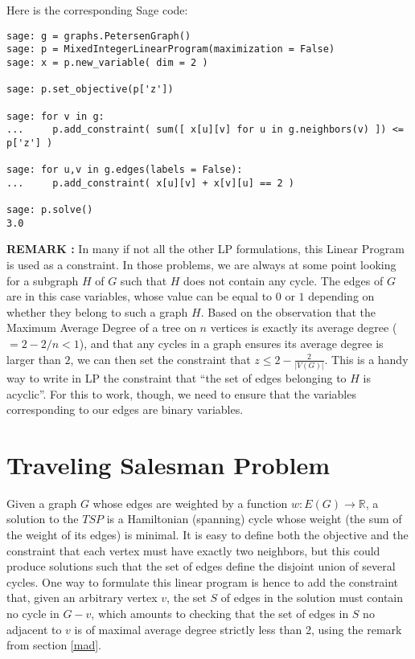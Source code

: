 Here is the corresponding Sage code:

\begin{lstlisting}
sage: g = graphs.PetersenGraph()
sage: p = MixedIntegerLinearProgram(maximization = False)
sage: x = p.new_variable( dim = 2 )

sage: p.set_objective(p['z'])

sage: for v in g:
...     p.add_constraint( sum([ x[u][v] for u in g.neighbors(v) ]) <= p['z'] )

sage: for u,v in g.edges(labels = False):
...     p.add_constraint( x[u][v] + x[v][u] == 2 )

sage: p.solve()
3.0
\end{lstlisting}

{\bf REMARK : } In many if not all the other LP formulations, this Linear Program is used as a constraint. In those problems, we are always at some point looking for a subgraph $H$ of $G$ such that $H$ does not contain any cycle. The edges of $G$ are in this case variables, whose value can be equal to $0$ or $1$ depending on whether they belong to such a graph $H$. Based on the observation that the Maximum Average Degree of a tree on $n$ vertices is exactly its average degree ($=2-2/n<1$), and that any cycles in a graph ensures its average degree is larger than $2$, we can then set the constraint that $z\leq 2-\frac 2 {|V(G)|}$. This is a handy way to write in LP the constraint that ``the set of edges belonging to $H$ is acyclic''. For this to work, though, we need to ensure that the variables corresponding to our edges are binary variables.



\section{Traveling Salesman Problem}
Given a graph $G$ whose edges are weighted by a function $w:E(G)\rightarrow \mathbb R$, a solution to the $TSP$ is a Hamiltonian (spanning) cycle whose weight (the sum of the weight of its edges) is minimal. It is easy to define both the objective and the constraint that each vertex must have exactly two neighbors, but this could produce solutions such that the set of edges define the disjoint union of several cycles. One way to formulate this linear program is hence to add the constraint that, given an arbitrary vertex $v$, the set $S$ of edges in the solution must contain no cycle in $G-v$, which amounts to checking that the set of edges in $S$ no adjacent to $v$ is of maximal average degree strictly less than 2, using the remark from section \ref{mad}.

